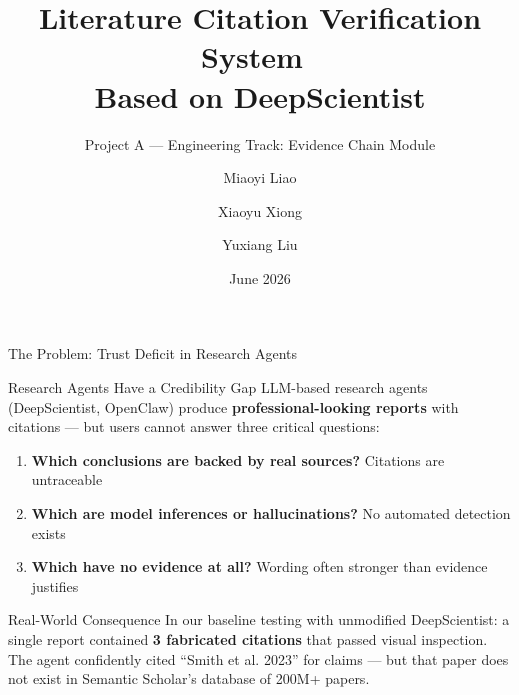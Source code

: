 \documentclass[aspectratio=169,11pt]{beamer}
\title{Literature Citation Verification System\ \\Based on DeepScientist}
\subtitle{Project A --- Engineering Track: Evidence Chain Module}
\author[Group 09]{Miaoyi Liao \and Xiaoyu Xiong \and Yuxiang Liu}
\institute[STA304]{STA304 Final Project · LLMs: From Principles to Applications}
\date{June 2026}
\begin{document}
\begin{frame}[plain]
  \titlepage
\end{frame}

\begin{frame}{The Problem: Trust Deficit in Research Agents}
  \begin{block}{Research Agents Have a Credibility Gap}
    LLM-based research agents (DeepScientist, OpenClaw) produce \textbf{professional-looking reports} with citations --- but users cannot answer three critical questions:
    \begin{enumerate}
      \item \textbf{Which conclusions are backed by real sources?} Citations are untraceable
      \item \textbf{Which are model inferences or hallucinations?} No automated detection exists
      \item \textbf{Which have no evidence at all?} Wording often stronger than evidence justifies
    \end{enumerate}
  \end{block}

  \begin{block}{Real-World Consequence}
    {\footnotesize In our baseline testing with unmodified DeepScientist: a single report contained \textbf{3 fabricated citations} that passed visual inspection. The agent confidently cited ``Smith et al. 2023'' for claims --- but that paper does not exist in Semantic Scholar's database of 200M+ papers.}
  \end{block}
\end{frame}
\end{document}
